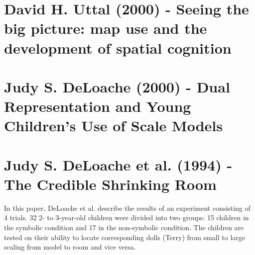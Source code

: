 \documentclass[12pt, letterpaper]{article}
\begin{document}
\pagestyle{fancy} %
\fancyhf{} %
\fancyfoot[C]{\thepage} %
\renewcommand{\headrulewidth}{0pt} %
\singlespacing
\vspace{1.0cm}

\begin{spacing}{1.10}

\section[Uttal - Map use and spatial cognition]{David H. Uttal (2000) - Seeing the big picture: map use and the development of spatial cognition \cite{Uttal2000Seeingthebigpicture}}
\label{sec:Uttal 2000 Seeing the big picture}
\leavevmode\par\noindent


\section[DeLoache - Dual Representation]{Judy S. DeLoache (2000) - Dual Representation and Young Children’s Use of Scale Models \cite{DeLoache2000DualRepresentation}}
\label{sec:DeLoache 2000 Dual Representation}
\leavevmode\par\noindent




\section[DeLoache et al. - Shrinking Room]{Judy S. DeLoache et al. (1994) - The Credible Shrinking Room \cite{DeLoache1994TheCredibleShrinkingRoom}}
\label{sec:DeLoache 1994 Shrinking Room}
\leavevmode\par
In this paper, DeLoache et al. describe the results of an experiment consisting of 4 trials. 32 2- to 3-year-old children were divided into two groups: 15 children in the symbolic condition and 17 in the non-symbolic condition. The children are tested on their ability to locate corresponding dolls (Terry) from small to large scaling from model to room and vice versa.
\break


\end{spacing}
\end{document}
